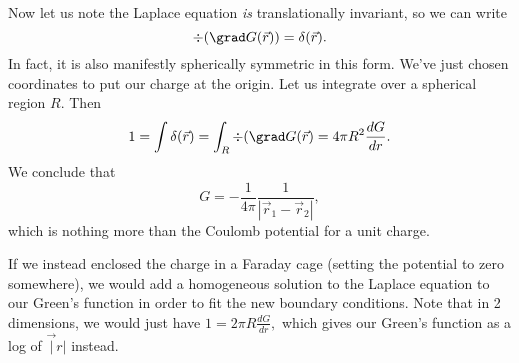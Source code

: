 Now let us note the Laplace equation \emph{is} translationally invariant, so we can write
\begin{equation}
    \div(\grad G (\vec r)) = \delta(\vec r).
\end{equation}
In fact, it is also manifestly spherically symmetric in this form. We've just chosen coordinates to put our charge at the origin. Let us integrate over a spherical region $R$. Then
\begin{equation}
    1= \int \delta(\vec r) = \int_R \div(\grad G(\vec r) = 4\pi R^2 \frac{dG}{dr}.
\end{equation}
We conclude that
\begin{equation}
    G = -\frac{1}{4\pi} \frac{1}{|\vec r_1-\vec r_2|},
\end{equation}
which is nothing more than the Coulomb potential for a unit charge.

If we instead enclosed the charge in a Faraday cage (setting the potential to zero somewhere), we would add a homogeneous solution to the Laplace equation to our Green's function in order to fit the new boundary conditions. Note that in 2 dimensions, we would just have $1=2\pi R \frac{dG}{dr},$ which gives our Green's function as a log of $\vec|r|$ instead.
